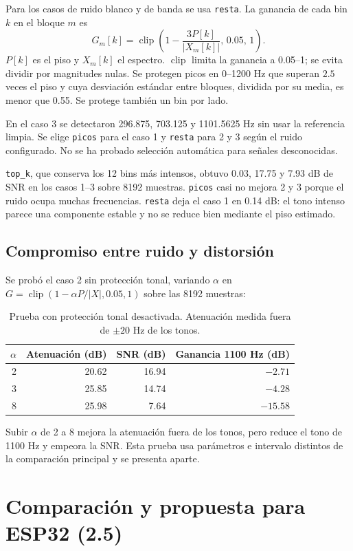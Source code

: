 \documentclass[11pt,a4paper]{article}
\newcommand{\ruta}[1]{\nolinkurl{#1}}
\begin{document}
Para los casos de ruido blanco y de banda se usa \ruta{resta}. La ganancia de cada bin $k$ en el bloque $m$ es
\begin{equation}
G_m[k]=\operatorname{clip}\left(1-\frac{3P[k]}{|X_m[k]|},\,0.05,\,1\right).
\end{equation}
$P[k]$ es el piso y $X_m[k]$ el espectro. $\operatorname{clip}$ limita la ganancia a 0.05--1; se evita dividir por magnitudes nulas. Se protegen picos en 0--1200 Hz que superan $2.5$ veces el piso y cuya desviación estándar entre bloques, dividida por su media, es menor que 0.55. Se protege también un bin por lado.

En el caso 3 se detectaron 296.875, 703.125 y 1101.5625 Hz sin usar la referencia limpia. Se elige \ruta{picos} para el caso 1 y \ruta{resta} para 2 y 3 según el ruido configurado. No se ha probado selección automática para señales desconocidas.

\ruta{top_k}, que conserva los 12 bins más intensos, obtuvo 0.03, 17.75 y 7.93 dB de SNR en los casos 1--3 sobre 8192 muestras. \ruta{picos} casi no mejora 2 y 3 porque el ruido ocupa muchas frecuencias. \ruta{resta} deja el caso 1 en 0.14 dB: el tono intenso parece una componente estable y no se reduce bien mediante el piso estimado.

\subsection{Compromiso entre ruido y distorsión}
Se probó el caso 2 sin protección tonal, variando $\alpha$ en $G=\operatorname{clip}(1-\alpha P/|X|,0.05,1)$ sobre las 8192 muestras:
\begin{table}[H]\centering\caption{Prueba con protección tonal desactivada. Atenuación medida fuera de $\pm20$ Hz de los tonos.}
\begin{tabular}{rrrr}\toprule $\alpha$ & Atenuación (dB) & SNR (dB) & Ganancia 1100 Hz (dB)\\\midrule
2&20.62&16.94&$-2.71$\\3&25.85&14.74&$-4.28$\\8&25.98&7.64&$-15.58$\\\bottomrule
\end{tabular}\end{table}
Subir $\alpha$ de 2 a 8 mejora la atenuación fuera de los tonos, pero reduce el tono de 1100 Hz y empeora la SNR. Esta prueba usa parámetros e intervalo distintos de la comparación principal y se presenta aparte.

\section{Comparación y propuesta para ESP32 (2.5)}
\end{document}
